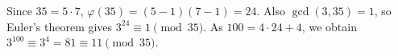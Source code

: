 Since $35=5\cdot7$, $\varphi(35)=(5-1)(7-1)=24$. Also $\gcd(3,35)=1$, so Euler's theorem gives $3^{24}\equiv1\pmod{35}$. As $100=4\cdot24+4$, we obtain $3^{100}\equiv3^4=81\equiv\boxed{11}\pmod{35}$.

